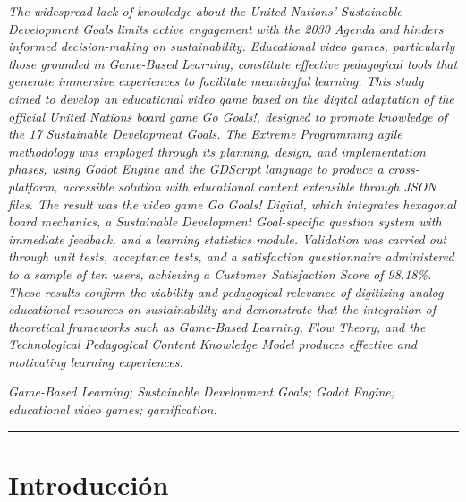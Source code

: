 \documentclass[12pt,a4paper]{article}
\begin{document}
\vspace{0.2cm}

{\itshape
The widespread lack of knowledge about the United Nations' Sustainable Development Goals limits active engagement with the 2030 Agenda and hinders informed decision-making on sustainability. Educational video games, particularly those grounded in Game-Based Learning, constitute effective pedagogical tools that generate immersive experiences to facilitate meaningful learning. This study aimed to develop an educational video game based on the digital adaptation of the official United Nations board game \textit{Go Goals!}, designed to promote knowledge of the 17 Sustainable Development Goals. The Extreme Programming agile methodology was employed through its planning, design, and implementation phases, using Godot Engine and the GDScript language to produce a cross-platform, accessible solution with educational content extensible through JSON files. The result was the video game \textit{Go Goals! Digital}, which integrates hexagonal board mechanics, a Sustainable Development Goal-specific question system with immediate feedback, and a learning statistics module. Validation was carried out through unit tests, acceptance tests, and a satisfaction questionnaire administered to a sample of ten users, achieving a Customer Satisfaction Score of 98.18\%. These results confirm the viability and pedagogical relevance of digitizing analog educational resources on sustainability and demonstrate that the integration of theoretical frameworks such as Game-Based Learning, Flow Theory, and the Technological Pedagogical Content Knowledge Model produces effective and motivating learning experiences.\par}

\vspace{0.3cm}

 \textit{Game-Based Learning; Sustainable Development Goals; Godot Engine; educational video games; gamification.}

\vspace{0.5cm}

\hrule
\vspace{0.5cm}

\newpage

\section{Introducción}
\end{document}
